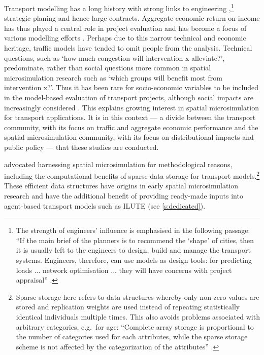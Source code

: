 Transport modelling has a long history with strong links to engineering
,\footnote{The strength of engineers'
influence is emphasised in the following passage: ``If the main brief
of the planners is to recommend the `shape' of cities,
then it is usually left to the engineers to design, build and manage the
transport systems. Engineers,
therefore, can use models as design tools: for predicting loads ...
network optimisation ... they will have concerns with project
appraisal'' \citep[p.~16]{Wilson1998-past}.}
strategic planing \citep{Wilson1998-past} and hence large contracts.
Aggregate economic return on income has thus played a central role in
project evaluation and has become a focus of various modelling efforts
\citep{Masser1992}.
Perhaps due to this narrow technical and economic heritage, traffic models
have tended to omit people from the analysis. Technical
questions, such as `how much congestion will intervention x alleviate?',
predominate, rather
than social questions more common in spatial microsimulation research
such as `which groups will benefit most from intervention x?'.
Thus it has been rare for socio-economic variables to be included in
the model-based evaluation of transport projects, although
social impacts are increasingly considered \citep{Masser1992, Tribby2012}.
This explains growing interest
in spatial microsimulation for transport applications.
It is in this context --- a divide between the transport community, with its focus
on traffic and aggregate economic performance and the spatial microsimulation
community, with its focus on distributional impacts and public policy --- that these
studies are conducted. 


\citet{Pritchard2012} advocated harnessing spatial microsimulation
for methodological reasons, including the computational benefits of sparse data storage
for transport models.\footnote{Sparse storage here refers to data structures
whereby only non-zero values are stored and replication
weights are used instead of repeating statistically identical individuals multiple
times. This also avoids problems associated with arbitrary categories, e.g.~for
age: ``Complete array storage is proportional to the number of categories used
for each attributes, while the sparse storage scheme is not affected by the
categorization of the attributes'' \citep[p.~691]{Pritchard2012}.} These
efficient %
data structures have origins in early spatial microsimulation
research \citep{Holm1987, Williamson1998} and have the additional benefit
of providing ready-made inputs into agent-based transport models such as
ILUTE (see \cref{s:dedicated}).


